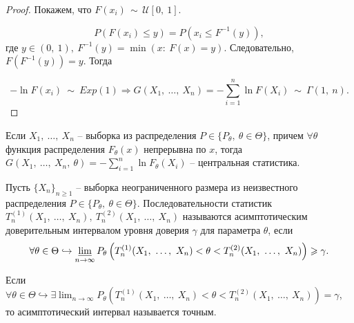 \begin{proof}
Покажем, что $\displaystyle F( x_{i}) \, \sim \, \mathcal{U}[ 0,\ 1]$.


\begin{equation*}
P( F( x_{i}) \leqslant y) =P\left( x_{i} \leqslant F^{-1}( y)\right) ,
\end{equation*}
где $\displaystyle y\in ( 0,\ 1) ,\ F^{-1}( y) =\min( x:\ F( x) =y)$. Следовательно, $\displaystyle F\left( F^{-1}( y)\right) =y$. Тогда


\begin{equation*}
-\ln F( x_{i}) \ \sim \ Exp( 1) \Rightarrow G( X_{1} ,\ \dotsc ,\ X_{n}) =-\sum _{i=1}^{n}\ln F( X_{i}) \ \sim \ \Gamma ( 1,\ n) .
\end{equation*}
\end{proof}
\begin{corollary}
Если $\displaystyle X_{1} ,\ \dotsc ,\ X_{n}$ -- выборка из распределения $\displaystyle P\in \{P_{\theta } ,\ \theta \in \Theta \}$, причем $\displaystyle \forall \theta $ функция распределения $\displaystyle F_{\theta }( x)$ непрерывна по $\displaystyle x$, тогда $\displaystyle G( X_{1} ,\ \dotsc ,\ X_{n} ,\ \theta ) =-\sum _{i=1}^{n}\ln F_{\theta }( X_{i})$ -- центральная статистика.
\end{corollary}

\begin{definition}
    Пусть $\displaystyle \{X_{n}\}_{n\geqslant 1}$ -- выборка неограниченного размера из неизвестного распределения $\displaystyle P\in \{P_{\theta } ,\ \theta \in \Theta \}$. Последовательности статистик $\displaystyle T_{n}^{( 1)}( X_{1} ,\ \dotsc ,\ X_{n}) ,\ T_{n}^{( 2)}( X_{1} ,\ \dotsc ,\ X_{n})$ называются асимптотическим доверительным интервалом уровня доверия $\displaystyle \gamma $ для параметра $\displaystyle \theta $, если
    \begin{equation*}
        \forall \theta \in \Theta \hookrightarrow \varliminf _{n\rightarrow \infty } P_{\theta }\left( T_{n}^{( 1)}( X_{1} ,\ \dotsc ,\ X_{n}) < \theta < T_{n}^{( 2)}( X_{1} ,\ \dotsc ,\ X_{n})\right) \geqslant \gamma .
    \end{equation*}
\end{definition}
Если $\displaystyle \forall \theta \in \Theta \hookrightarrow \exists \lim _{n\rightarrow \infty } P_{\theta }\left( T_{n}^{( 1)}( X_{1} ,\ \dotsc ,\ X_{n}) < \theta < T_{n}^{( 2)}( X_{1} ,\ \dotsc ,\ X_{n})\right) =\gamma $, то асимптотический интервал называется точным.\\

